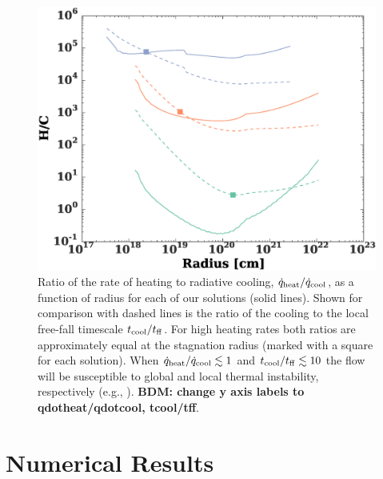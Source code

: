 \documentclass[usenatbib,fleqn]{mn2e}
\begin{document}
\begin{figure}
  \includegraphics[width=\columnwidth]{cooling.eps}
  \caption{\label{fig:cooling} Ratio of the rate of heating to radiative cooling, $\dot{q}_{\rm heat}/\dot{q}_{\rm cool}$, as a function of radius for each of our solutions (solid lines).  Shown for comparison with dashed lines is the ratio of the cooling to the local free-fall timescale $t_{\rm cool}/t_{\rm ff}$.  For high heating rates both ratios are approximately equal at the stagnation radius (marked with a square for each solution).  When $\dot{q}_{\rm heat}/\dot{q}_{\rm cool} \lesssim 1$ and $t_{\rm cool}/t_{\rm ff} \lesssim 10$ the flow will be susceptible to global and local thermal instability, respectively (e.g.,  \citealt{McCourt+12}).  {\bf BDM: change y axis labels to qdotheat/qdotcool, tcool/tff}.}
\end{figure}


%


\section{Numerical Results}
\label{sec:numerical}
\end{document}
